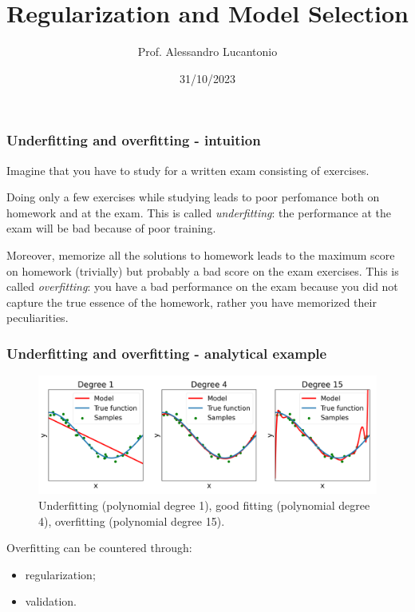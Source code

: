 \documentclass{beamer}
\title{Regularization and Model Selection}
\author{Prof. Alessandro Lucantonio}
\institute{Aarhus University}
\date{31/10/2023}
\begin{document}
	\frame{\titlepage}
	
		\begin{frame}
		\frametitle{Underfitting and overfitting - intuition}
		
		Imagine that you have to study for a written exam consisting of exercises. 
		
		\vspace{5mm}
		
		Doing only a few exercises while studying leads to poor perfomance both on homework and at the exam. This is called \textsl{underfitting}: the performance at the exam will be bad because of poor training.
		
		\vspace{5mm}
		
		Moreover, memorize all the solutions to homework leads to the maximum score on homework (trivially) but probably a bad score on the exam exercises. This is called \textsl{overfitting}: you have a bad performance on the exam because you did not capture the true essence of the homework, rather you have memorized their peculiarities.
	\end{frame}
	
	\begin{frame}
		\frametitle{Underfitting and overfitting - analytical example}
		\begin{figure}
			\centering
			\includegraphics[scale=0.35]{images/overfitting_poly}
			\caption{Underfitting (polynomial degree 1), good fitting (polynomial degree 4), overfitting (polynomial degree 15).}
		\end{figure}
		
		Overfitting can be countered through:
		\begin{itemize}
			\item regularization;
			\item validation.
		\end{itemize}
	\end{frame}
	
\end{document}
